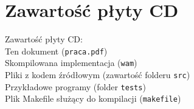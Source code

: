 \chapter{Zawartość płyty CD}
\thispagestyle{chapterBeginStyle}
\label{plytaCD}

Zawartość płyty CD:\\
Ten dokument (\texttt{praca.pdf})\\
Skompilowana implementacja (\texttt{wam})\\
Pliki z kodem źródłowym (zawartość folderu \texttt{src})\\
Przykładowe programy (folder \texttt{tests})\\
Plik Makefile służący do kompilacji (\texttt{makefile})

